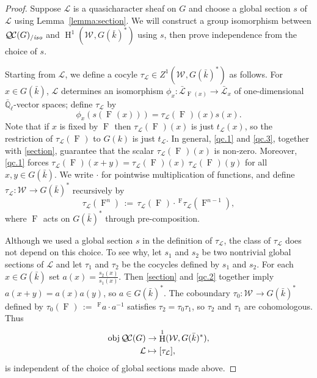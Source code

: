 \documentclass[11pt]{amsart}
\theoremstyle{plain}
\theoremstyle{definition}
\theoremstyle{remark}
\newcommand{\EE}{\mathbb{\bar Q}_\ell}
\newcommand{\bFq}{\bar{k}}
\newcommand{\Frob}[1]{\operatorname{F}_{#1}}
\DeclareMathOperator{\Hh}{H}
\newcommand{\ceq}{{\, :=\, }}
\newcommand{\obj}{{\text{obj}\, }}
\newcommand{\qcs}[1]{{\mathcal{#1}}}
\newcommand{\gqcs}[1]{{\mathcal{\bar #1}}}
\newcommand{\QC}{{\mathcal{Q\hskip-0.8pt C}}}
\newcommand{\QCiso}[1]{\QC(#1)_{/\textit{iso}}}
\newcommand{\Weil}[1]{\mathcal{W}_{#1}}
\newcommand{\trFrob}[1]{t_{#1}}
\begin{document}
\begin{proof}
  Suppose $\qcs{L}$ is a quasicharacter sheaf on $G$ and choose a global section $s$
  of $\qcs{L}$ using Lemma~\ref{lemma:section}.
  We will construct a group isomorphism between $\QCiso{G}$ and
  $\Hh^1(\Weil{}, G(\bFq)^*)$ using $s$, then prove independence from the choice of $s$.

  Starting from $\qcs{L}$, we define a cocyle $\tau_{\qcs{L}} \in Z^1(\Weil{},G(\bFq)^*)$ as follows.
  For $x \in G(\bFq)$, $\qcs{L}$ determines an isomorphism $\phi_x : \gqcs{L}_{\Frob{}(x)} \to \gqcs{L}_x$
  of one-dimensional $\EE$-vector spaces; define $\tau_\qcs{L}$ by
  \begin{equation}\label{t}
   \phi_{x}(s(\Frob{}(x))) = \tau_\qcs{L}(\Frob{})(x) s(x).
  \end{equation}
  Note that if $x$ is fixed by $\Frob{}$ then $\tau_\qcs{L}(\Frob{})(x)$ is just $\trFrob{\qcs{L}}(x)$, so the restriction of
  $\tau_\qcs{L}(\Frob{})$ to $G(k)$ is just $\trFrob{\qcs{L}}$.
  In general, \ref{qc.1} and \ref{qc.3}, together with \eqref{section}, guarantee that
  the scalar $\tau_\qcs{L}(\Frob{})(x)$ is non-zero.  Moreover, 
  \ref{qc.1} forces
  $\tau_\qcs{L}(\Frob{})(x+y) = \tau_\qcs{L}(\Frob{})(x) \ \tau_\qcs{L}(\Frob{})(y)$
  for all $x,y \in G(\bFq)$.  We write $\cdot$ for pointwise multiplication of functions, and
  define $\tau_\qcs{L} : \Weil{} \to G(\bFq)^*$ recursively by
  \[
   \tau_\qcs{L}(\Frob{}^n) \ceq \tau_\qcs{L}(\Frob{})\cdot \,^{\Frob{}} \tau_\qcs{L}(\Frob{}^{n-1}),
  \]
  where $\Frob{}$ acts on $G(\bFq)^*$ through pre-composition.

  Although we used a global section $s$ in the definition of
  $\tau_\qcs{L}$, the class of $\tau_\qcs{L}$ does not depend on this
  choice. To see why, let $s_1$ and $s_2$ be two nontrivial global sections of
  $\qcs{L}$ and let $\tau_1$ and $\tau_2$ be the cocycles defined by $s_1$ and $s_2$.
  For each $x \in G(\bFq)$ set $a(x) = \frac{s_2(x)}{s_1(x)}$.  Then \eqref{section} and
  \ref{qc.2} together imply $a(x+y) = a(x)a(y)$, so
  $a\in G(\bFq)^*$.  The coboundary $\tau_0 : \Weil{} \to G(\bFq)^*$
  defined by $\tau_0(\Frob{}) \ceq \,^{\Frob{}} a \cdot a^{-1}$ satisfies $\tau_2 = \tau_0 \tau_1$,
  so $\tau_2$ and $\tau_1$ are cohomologous. Thus
  \begin{equation}\label{cohomologous}
  \begin{split}
    \obj \QC(G) &\to \Hh^1(\Weil{},G(\bFq)^*), \\
    \qcs{L} &\mapsto [\tau_\qcs{L}],
  \end{split}
  \end{equation}
  is independent of the choice of global sections made above.


\end{proof}
\end{document}
